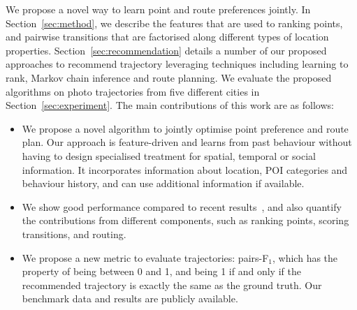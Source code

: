 We propose a novel way to learn point and route preferences jointly.
In Section~\ref{sec:method}, we describe the features that are used to ranking points,
and pairwise transitions that are factorised along %
different types of location properties.
Section~\ref{sec:recommendation} details a number of our proposed approaches to recommend trajectory leveraging techniques including
learning to rank, Markov chain inference and route planning.
We evaluate the proposed algorithms on photo trajectories from five different cities in Section~\ref{sec:experiment}.
The main contributions of this work are as follows:
\begin{itemize}
\setlength{\itemsep}{-2pt}
\item We propose a novel algorithm to jointly optimise point preference and route plan.
Our approach is feature-driven and learns from past behaviour without having to design specialised treatment for spatial, temporal or social information. It incorporates information about location, POI categories and behaviour history, and can use additional %
information if available.
\item We show good performance compared to recent results~\cite{ijcai15}, and also quantify the contributions from different components, such as ranking points, scoring transitions, and routing.
\item We propose a new metric to evaluate trajectories: pairs-F$_1$, which has the property of being between 0 and 1, and being 1 if and only if the recommended trajectory is exactly the same as the ground truth. Our benchmark data and results are publicly available.
\end{itemize}
